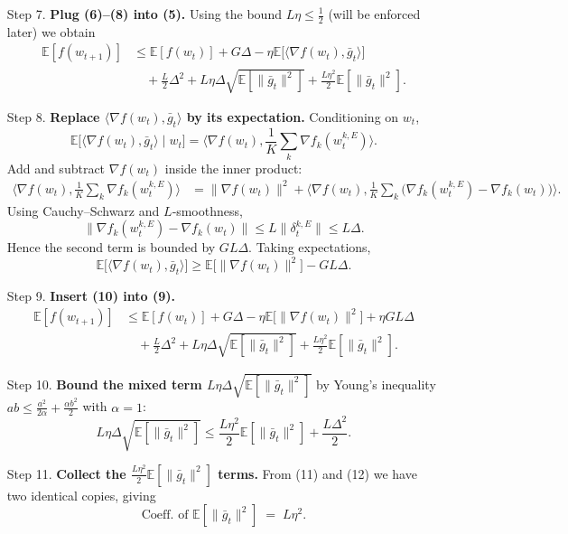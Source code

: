 \documentclass{article}
\newcommand{\E}{\mathbb{E}}
\begin{document}
\begin{enumerate}
\item[Step 7.] \textbf{Plug (6)–(8) into (5).}
Using the bound $L\eta\le \frac12$ (will be enforced later) we obtain
\[
\begin{aligned}
\E[f(w_{t+1})]
&\le \E[f(w_t)]
   + G\Delta
   -\eta\E\!\big[\langle\nabla f(w_t),\bar g_t\rangle\big] \\
&\quad +\frac{L}{2}\Delta^2
   +L\eta\Delta\sqrt{\E[\|\bar g_t\|^2]}
   +\frac{L\eta^2}{2}\E[\|\bar g_t\|^2] .
\tag{9}
\end{aligned}
\]

\item[Step 8.] \textbf{Replace $\langle\nabla f(w_t),\bar g_t\rangle$ by its expectation.}
Conditioning on $w_t$,
\[
\E\!\big[\langle\nabla f(w_t),\bar g_t\rangle\mid w_t\big]
= \big\langle\nabla f(w_t),\frac1K\sum_{k}\nabla f_k(w_{t}^{k,E})\big\rangle .
\]
Add and subtract $\nabla f(w_t)$ inside the inner product:
\[
\begin{aligned}
\langle\nabla f(w_t),\frac1K\sum_{k}\nabla f_k(w_{t}^{k,E})\rangle
&= \|\nabla f(w_t)\|^2
   +\Big\langle\nabla f(w_t),
          \frac1K\sum_{k}\big(\nabla f_k(w_{t}^{k,E})-\nabla f_k(w_t)\big)\Big\rangle .
\end{aligned}
\]
Using Cauchy–Schwarz and $L$‑smoothness,
\[
\big\|\nabla f_k(w_{t}^{k,E})-\nabla f_k(w_t)\big\|
\le L\|\delta_{t}^{k,E}\|\le L\Delta .
\]
Hence the second term is bounded by $G L\Delta$.
Taking expectations,
\[
\E\!\big[\langle\nabla f(w_t),\bar g_t\rangle\big]
\ge \E\!\big[\|\nabla f(w_t)\|^2\big]- G L\Delta .
\tag{10}
\]

\item[Step 9.] \textbf{Insert (10) into (9).}
\[
\begin{aligned}
\E[f(w_{t+1})]
&\le \E[f(w_t)]
   + G\Delta
   -\eta\E\!\big[\|\nabla f(w_t)\|^2\big]
   +\eta G L\Delta \\
&\quad +\frac{L}{2}\Delta^2
   +L\eta\Delta\sqrt{\E[\|\bar g_t\|^2]}
   +\frac{L\eta^2}{2}\E[\|\bar g_t\|^2] .
\tag{11}
\end{aligned}
\]

\item[Step 10.] \textbf{Bound the mixed term $L\eta\Delta\sqrt{\E[\|\bar g_t\|^2]}$}
by Young’s inequality $ab\le\frac{a^2}{2\alpha}+\frac{\alpha b^2}{2}$ with
$\alpha=1$:
\[
L\eta\Delta\sqrt{\E[\|\bar g_t\|^2]}
\le \frac{L\eta^2}{2}\E[\|\bar g_t\|^2] + \frac{L\Delta^2}{2}.
\tag{12}
\]

\item[Step 11.] \textbf{Collect the $\frac{L\eta^2}{2}\E[\|\bar g_t\|^2]$ terms.}
From (11) and (12) we have two identical copies, giving
\[
\text{Coeff. of }\E[\|\bar g_t\|^2]\;=\;L\eta^2 .
\tag{13}
\]


\end{enumerate}
\end{document}
